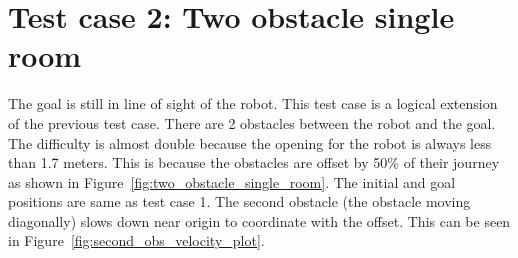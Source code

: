 \section{Test case 2: Two obstacle single room}%
\label{sec:test_case_2_two_obstacle_single_room}
    The goal is still in line of sight of the robot. This test case is a logical extension of
    the previous test case. There are 2 obstacles between the robot and the goal. The difficulty
    is almost double because the opening for the robot is always less than 1.7 meters. This is 
    because the obstacles are offset by 50\% of their journey as shown in Figure~\ref{fig:two_obstacle_single_room}.
    The initial and goal positions are same as test case 1. The second obstacle (the obstacle moving 
    diagonally) slows down near origin to coordinate with the offset. This can be seen in Figure~\ref{fig:second_obs_velocity_plot}.
